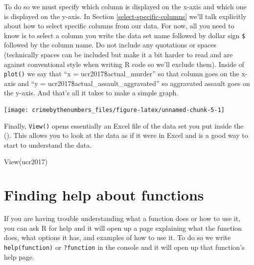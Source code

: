 \documentclass[
  12pt,
  openany]{book}
\newenvironment{Shaded}{\begin{snugshade}}{\end{snugshade}}
\newcommand{\AttributeTok}[1]{\textcolor[rgb]{0.61,0.61,0.61}{#1}}
\newcommand{\FunctionTok}[1]{\textcolor[rgb]{0,0,0}{#1}}
\newcommand{\NormalTok}[1]{#1}
\newcommand{\SpecialCharTok}[1]{\textcolor[rgb]{0,0,0}{#1}}
\begin{document}
To do so we must specify which column is displayed on the x-axis and which one is displayed on the y-axis. In Section \ref{select-specific-columns} we'll talk explicitly about how to select specific columns from our data. For now, all you need to know is to select a column you write the data set name followed by dollar sign \texttt{\$} followed by the column name. Do not include any quotations or spaces (technically spaces can be included but make it a bit harder to read and are against conventional style when writing R code so we'll exclude them). Inside of \texttt{plot()} we say that ``x = ucr2017\$actual\_murder'' so that column goes on the x-axis and ``y = ucr2017\$actual\_assault\_aggravated'' so aggravated assault goes on the y-axis. And that's all it takes to make a simple graph.

\begin{Shaded}
\end{Shaded}

\begin{center}\texttt{[image: crimebythenumbers\_files/figure-latex/unnamed-chunk-5-1]} \end{center}

Finally, \texttt{View()} opens essentially an Excel file of the data set you put inside the (). This allows you to look at the data as if it were in Excel and is a good way to start to understand the data.

\begin{Shaded}
\begin{Highlighting}[]
\FunctionTok{View}\NormalTok{(ucr2017)}
\end{Highlighting}
\end{Shaded}

\hypertarget{finding-help-about-functions}{%
\section{Finding help about functions}\label{finding-help-about-functions}}

If you are having trouble understanding what a function does or how to use it, you can ask R for help and it will open up a page explaining what the function does, what options it has, and examples of how to use it. To do so we write \texttt{help(function)} or \texttt{?function} in the console and it will open up that function's help page.
\end{document}
